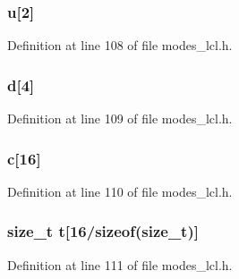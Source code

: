 \subsubsection[{\texorpdfstring{u}{u}}]{ u\mbox{[}2\mbox{]}}\hypertarget{structgcm128__context_a1c262682a23875ddb957cb140d21df0a}{}\label{structgcm128__context_a1c262682a23875ddb957cb140d21df0a}


Definition at line 108 of file modes\+\_\+lcl.\+h.

\subsubsection[{\texorpdfstring{d}{d}}]{ d\mbox{[}4\mbox{]}}\hypertarget{structgcm128__context_ac5928bddec19c3fc926ab4e6f16c9e2e}{}\label{structgcm128__context_ac5928bddec19c3fc926ab4e6f16c9e2e}


Definition at line 109 of file modes\+\_\+lcl.\+h.

\subsubsection[{\texorpdfstring{c}{c}}]{ c\mbox{[}16\mbox{]}}\hypertarget{structgcm128__context_ae26a622d631b648ed55c8e2338e3a77b}{}\label{structgcm128__context_ae26a622d631b648ed55c8e2338e3a77b}


Definition at line 110 of file modes\+\_\+lcl.\+h.

\subsubsection[{\texorpdfstring{t}{t}}]{\setlength{\rightskip}{0pt plus 5cm}size\+\_\+t t\mbox{[}16/sizeof(size\+\_\+t)\mbox{]}}\hypertarget{structgcm128__context_a2005a0cbe34e85a1c6cdc7fd410ac6b9}{}\label{structgcm128__context_a2005a0cbe34e85a1c6cdc7fd410ac6b9}


Definition at line 111 of file modes\+\_\+lcl.\+h.

